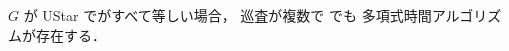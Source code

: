 







\begin{theo}
	\label{theo:3_UStar_multiple_Q_polytime}
	$G$ が UStar で{\timelimit}がすべて等しい場合，
	巡査が複数で \optpp でも
	多項式時間アルゴリズムが存在する．
\end{theo}

